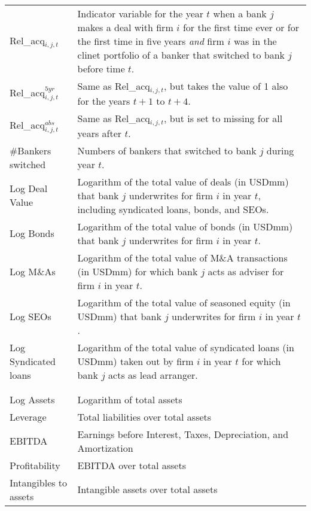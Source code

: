 \begin{landscape}
\begin{longtable}[c]{p{} p{} }
 	Rel\_acq$_{i,j,t}$ & Indicator variable for the year $t$ when a bank $j$ makes a deal with firm $i$ for the first time ever or for the first time in five years \emph{and} firm $i$ was in the clinet portfolio of a banker that switched to bank $j$ before time $t$.  \\
	Rel\_acq$^{5yr}_{i,j,t}$ & Same as Rel\_acq$_{i,j,t}$, but takes the value of 1 also for the years $t+1$ to $t+4$. \\
	Rel\_acq$^{abs}_{i,j,t}$ & Same as Rel\_acq$_{i,j,t}$, but is set to missing for all years after $t$. \\
	\#Bankers switched & Numbers of bankers that switched to bank $j$ during year $t$. \\
	Log Deal Value & Logarithm of the total value of deals (in USDmm) that bank $j$ underwrites for firm $i$ in year $t$, including syndicated loans, bonds, and SEOs.  \\
	Log Bonds & Logarithm of the total value of bonds (in USDmm) that bank $j$ underwrites for firm $i$ in year $t$. \\
	Log M\&As & Logarithm of the total value of M\&A transactions (in USDmm) for which bank $j$ acts as adviser for firm $i$ in year $t$. \\
	Log SEOs & Logarithm of the total value of seasoned equity (in USDmm) that bank $j$ underwrites for firm $i$ in year $t$. \\
	Log Syndicated loans & Logarithm of the total value of syndicated loans (in USDmm) taken out by firm $i$ in year $t$ for which bank $j$ acts as lead arranger. \\ & \\
	\pagebreak

	\multicolumn{2}{l}{\textbf{Panel B:} Bank- and firm-level variables} \\
 	\midrule
 	Log Assets & Logarithm of total assets \\
 	Leverage & Total liabilities over total assets \\
 	EBITDA & Earnings before Interest, Taxes, Depreciation, and Amortization \\
 	Profitability & EBITDA over total assets \\
 	Intangibles to assets & Intangible assets over total assets \\

\end{longtable} \end{landscape}




	